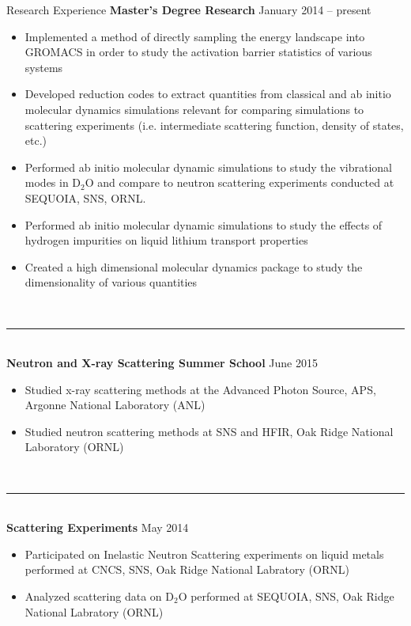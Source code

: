 \documentclass{resume} %
\begin{document}


\begin{rSection}{Research Experience}
	{\bf Master's Degree Research} \hfill {January 2014 -- present}
	\begin{itemize}
	\item Implemented a method of directly sampling the energy landscape into GROMACS in order to study the activation barrier statistics of various systems
	\item Developed reduction codes to extract quantities from classical and ab initio molecular dynamics simulations relevant for comparing simulations to scattering experiments (i.e. intermediate scattering function, density of states, etc.) 
	\item Performed ab initio molecular dynamic simulations to study the vibrational modes in D$_2$O and compare to neutron scattering experiments conducted at SEQUOIA, SNS, ORNL. 
	\item Performed ab initio molecular dynamic simulations to study the effects of hydrogen impurities on liquid lithium transport properties
	\item Created a high dimensional molecular dynamics package to study the dimensionality of various quantities
	\end{itemize}
	\\
	{\centering\noindent\rule{5cm}{0.4pt}}
	\\
	{\bf Neutron and X-ray Scattering Summer School} \hfill {June 2015}
	\begin{itemize}
	\item Studied x-ray scattering methods at the Advanced Photon Source, APS, Argonne National Laboratory (ANL)
	\item Studied neutron scattering methods at SNS and HFIR, Oak Ridge National Laboratory (ORNL)
	\end{itemize}
	\\
	{\centering\noindent\rule{5cm}{0.4pt}}
	\\
	{\bf Scattering Experiments} \hfill {May 2014}
	\begin{itemize}
	\item Participated on Inelastic Neutron Scattering experiments on liquid metals performed at CNCS, SNS, Oak Ridge National Labratory (ORNL) 
	\item Analyzed scattering data on D$_2$O performed at SEQUOIA, SNS, Oak Ridge National Labratory (ORNL)

\end{itemize}
\end{rSection}
\end{document}
